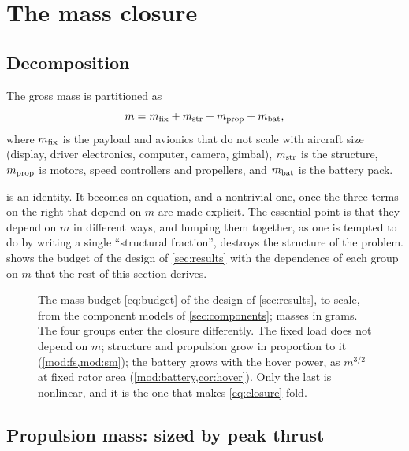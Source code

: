 ﻿\section{The mass closure}
\label{sec:closure}

\subsection{Decomposition}

\begin{definition}
The gross mass is partitioned as
\begin{equation}
  m = m_{\mathrm{fix}} + m_{\mathrm{str}} + m_{\mathrm{prop}} + m_{\mathrm{bat}} ,
  \label{eq:budget}
\end{equation}
where $m_{\mathrm{fix}}$ is the payload and avionics that do not scale with aircraft size
(display, driver electronics, computer, camera, gimbal), $m_{\mathrm{str}}$ is the
structure, $m_{\mathrm{prop}}$ is motors, speed controllers and propellers, and $m_{\mathrm{bat}}$ is
the battery pack.
\end{definition}

 is an identity. It becomes an equation, and a nontrivial one,
once the three terms on the right that depend on $m$ are made explicit. The
essential point is that they depend on $m$ in different ways, and lumping them
together, as one is tempted to do by writing a single ``structural fraction'',
destroys the structure of the problem.  shows the budget of
the design of \cref{sec:results} with the dependence of each group on $m$ that
the rest of this section derives.

\begin{figure}[tbp]
\centering

\caption{The mass budget \cref{eq:budget} of the design of \cref{sec:results},
to scale, from the component models of \cref{sec:components}; masses in grams.
The four groups enter the closure differently. The fixed load does not depend
on $m$; structure and propulsion grow in proportion to it
(\cref{mod:fs,mod:sm}); the battery grows with the hover power, as $m^{3/2}$
at fixed rotor area (\cref{mod:battery,cor:hover}). Only the last is
nonlinear, and it is the one that makes \cref{eq:closure} fold.}
\label{fig:budget}
\end{figure}

\subsection{Propulsion mass: sized by peak thrust}

